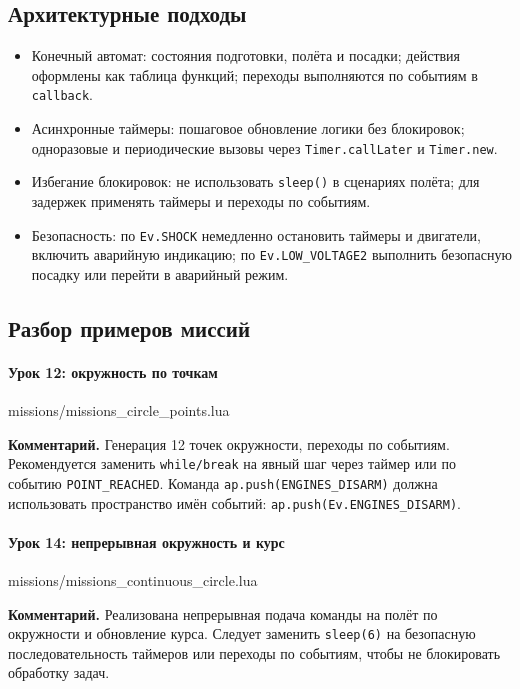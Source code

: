 \subsection{Архитектурные подходы}
\begin{itemize}
  \item Конечный автомат: состояния подготовки, полёта и посадки; действия оформлены как таблица функций; переходы выполняются по событиям в \texttt{callback}.
  \item Асинхронные таймеры: пошаговое обновление логики без блокировок; одноразовые и периодические вызовы через \texttt{Timer.callLater} и \texttt{Timer.new}.
  \item Избегание блокировок: не использовать \texttt{sleep()} в сценариях полёта; для задержек применять таймеры и переходы по событиям.
  \item Безопасность: по \texttt{Ev.SHOCK} немедленно остановить таймеры и двигатели, включить аварийную индикацию; по \texttt{Ev.LOW\_VOLTAGE2} выполнить безопасную посадку или перейти в аварийный режим.
\end{itemize}

\subsection{Разбор примеров миссий}
\paragraph{Урок 12: окружность по точкам}
\begin{codefile}{missions/missions_circle_points.lua}
\end{codefile}
\textbf{Комментарий.} Генерация 12 точек окружности, переходы по событиям. Рекомендуется заменить \texttt{while/break} на явный шаг через таймер или по событию \texttt{POINT\_REACHED}. Команда \texttt{ap.push(ENGINES\_DISARM)} должна использовать пространство имён событий: \texttt{ap.push(Ev.ENGINES\_DISARM)}.

\paragraph{Урок 14: непрерывная окружность и курс}
\begin{codefile}{missions/missions_continuous_circle.lua}
\end{codefile}
\textbf{Комментарий.} Реализована непрерывная подача команды на полёт по окружности и обновление курса. Следует заменить \texttt{sleep(6)} на безопасную последовательность таймеров или переходы по событиям, чтобы не блокировать обработку задач.

